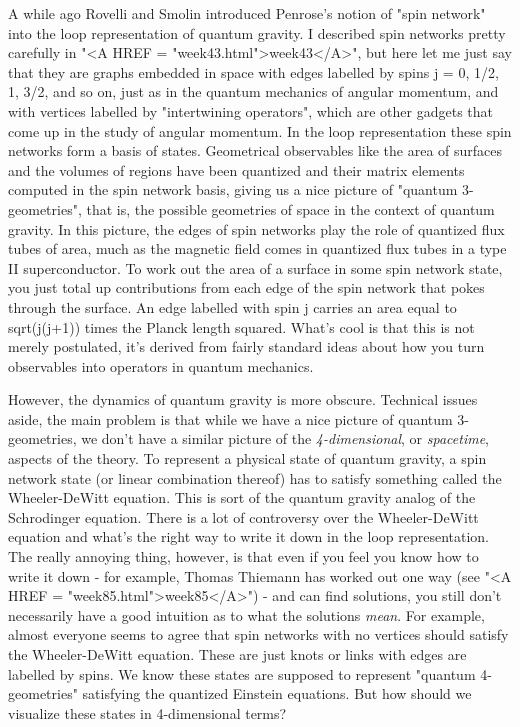 A while ago Rovelli and Smolin introduced Penrose's notion of "spin
network" into the loop representation of quantum gravity.  I described
spin networks pretty carefully in "<A HREF = "week43.html">week43</A>", but here let me just say
that they are graphs embedded in space with edges labelled by spins j
= 0, 1/2, 1, 3/2, and so on, just as in the quantum mechanics of
angular momentum, and with vertices labelled by "intertwining
operators", which are other gadgets that come up in the study of
angular momentum.  In the loop representation these spin networks form
a basis of states.  Geometrical observables like the area of surfaces
and the volumes of regions have been quantized and their matrix
elements computed in the spin network basis, giving us a nice picture
of "quantum 3-geometries", that is, the possible geometries of space
in the context of quantum gravity.  In this picture, the edges of spin
networks play the role of quantized flux tubes of area, much as the
magnetic field comes in quantized flux tubes in a type II
superconductor.  To work out the area of a surface in some spin
network state, you just total up contributions from each edge of the
spin network that pokes through the surface.  An edge labelled with
spin j carries an area equal to sqrt(j(j+1)) times the Planck length
squared.  What's cool is that this is not merely postulated, it's 
derived from fairly standard ideas about how you turn observables into
operators in quantum mechanics.  

However, the dynamics of quantum gravity is more obscure.  Technical
issues aside, the main problem is that while we have a nice picture of
quantum 3-geometries, we don't have a similar picture of the
\emph{4-dimensional}, or \emph{spacetime}, aspects of the theory.  To represent
a physical state of quantum gravity, a spin network state (or linear
combination thereof) has to satisfy something called the
Wheeler-DeWitt equation.  This is sort of the quantum gravity analog
of the Schrodinger equation.  There is a lot of controversy over the
Wheeler-DeWitt equation and what's the right way to write it down in
the loop representation.  The really annoying thing, however, is that
even if you feel you know how to write it down - for example, Thomas
Thiemann has worked out one way (see "<A HREF = "week85.html">week85</A>") - and can find
solutions, you still don't necessarily have a good intuition as to
what the solutions \emph{mean}.  For example, almost everyone seems to
agree that spin networks with no vertices should satisfy the
Wheeler-DeWitt equation.  These are just knots or links with edges are
labelled by spins.  We know these states are supposed to represent
"quantum 4-geometries" satisfying the quantized Einstein equations.
But how should we visualize these states in 4-dimensional terms?

